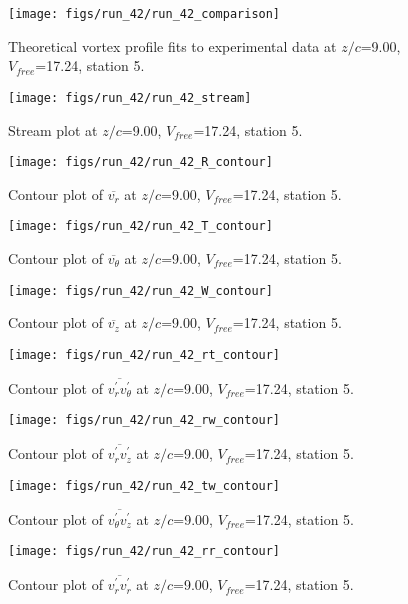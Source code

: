 \begin{figure}[H]
\centering
\texttt{[image: figs/run\_42/run\_42\_comparison]}
\caption{Theoretical vortex profile fits to experimental data at $z/c$=9.00, $V_{free}$=17.24, station 5.}
\end{figure}


\begin{figure}[H]
\centering
\texttt{[image: figs/run\_42/run\_42\_stream]}
\caption{Stream plot at $z/c$=9.00, $V_{free}$=17.24, station 5.}
\end{figure}


\begin{figure}[H]
\centering
\texttt{[image: figs/run\_42/run\_42\_R\_contour]}
\caption{Contour plot of $\overline{v_{r}}$ at $z/c$=9.00, $V_{free}$=17.24, station 5.}
\end{figure}


\begin{figure}[H]
\centering
\texttt{[image: figs/run\_42/run\_42\_T\_contour]}
\caption{Contour plot of $\overline{v_{\theta}}$ at $z/c$=9.00, $V_{free}$=17.24, station 5.}
\end{figure}


\begin{figure}[H]
\centering
\texttt{[image: figs/run\_42/run\_42\_W\_contour]}
\caption{Contour plot of $\overline{v_{z}}$ at $z/c$=9.00, $V_{free}$=17.24, station 5.}
\end{figure}


\begin{figure}[H]
\centering
\texttt{[image: figs/run\_42/run\_42\_rt\_contour]}
\caption{Contour plot of $\overline{v_{r}^{\prime} v_{\theta}^{\prime}}$ at $z/c$=9.00, $V_{free}$=17.24, station 5.}
\end{figure}


\begin{figure}[H]
\centering
\texttt{[image: figs/run\_42/run\_42\_rw\_contour]}
\caption{Contour plot of $\overline{v_{r}^{\prime} v_{z}^{\prime}}$ at $z/c$=9.00, $V_{free}$=17.24, station 5.}
\end{figure}


\begin{figure}[H]
\centering
\texttt{[image: figs/run\_42/run\_42\_tw\_contour]}
\caption{Contour plot of $\overline{v_{\theta}^{\prime} v_{z}^{\prime}}$ at $z/c$=9.00, $V_{free}$=17.24, station 5.}
\end{figure}


\begin{figure}[H]
\centering
\texttt{[image: figs/run\_42/run\_42\_rr\_contour]}
\caption{Contour plot of $\overline{v_{r}^{\prime} v_{r}^{\prime}}$ at $z/c$=9.00, $V_{free}$=17.24, station 5.}
\end{figure}


